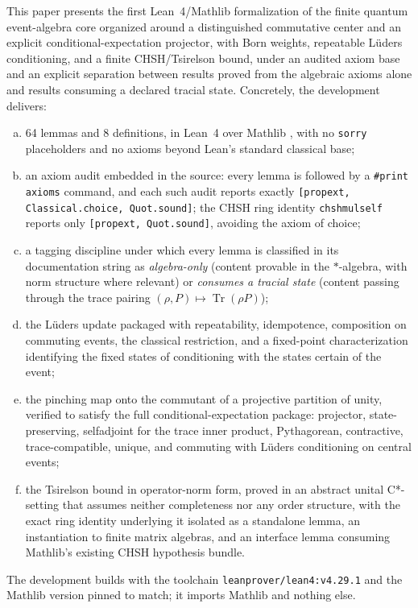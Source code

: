 \documentclass[11pt]{article}
\renewcommand{\_}{\textunderscore\allowbreak}
\theoremstyle{remark}
\newcommand{\Tr}{\operatorname{Tr}}
\begin{document}
This paper presents the first Lean~4/Mathlib formalization of the finite quantum event-algebra core organized around a distinguished commutative center and an explicit conditional-expectation projector, with Born weights, repeatable L\"uders conditioning, and a finite CHSH/Tsirelson bound, under an audited axiom base and an explicit separation between results proved from the algebraic axioms alone and results consuming a declared tracial state. Concretely, the development delivers:
\begin{enumerate}[(a)]
\item 64 lemmas and 8 definitions, in Lean~4 \cite{lean4} over Mathlib \cite{mathlib2020}, with no \texttt{sorry} placeholders and no axioms beyond Lean's standard classical base;
\item an axiom audit embedded in the source: every lemma is followed by a \texttt{\#print axioms} command, and each such audit reports exactly \texttt{[propext, Classical.choice, Quot.sound]}; the CHSH ring identity \texttt{chsh\_mul\_self} reports only \texttt{[propext, Quot.sound]}, avoiding the axiom of choice;
\item a tagging discipline under which every lemma is classified in its documentation string as \emph{algebra-only} (content provable in the $*$-algebra, with norm structure where relevant) or \emph{consumes a tracial state} (content passing through the trace pairing $(\rho,P) \mapsto \Tr(\rho P)$);
\item the L\"uders update packaged with repeatability, idempotence, composition on commuting events, the classical restriction, and a fixed-point characterization identifying the fixed states of conditioning with the states certain of the event;
\item the pinching map onto the commutant of a projective partition of unity, verified to satisfy the full conditional-expectation package: projector, state-preserving, selfadjoint for the trace inner product, Pythagorean, contractive, trace-compatible, unique, and commuting with L\"uders conditioning on central events;
\item the Tsirelson bound in operator-norm form, proved in an abstract unital C*-setting that assumes neither completeness nor any order structure, with the exact ring identity underlying it isolated as a standalone lemma, an instantiation to finite matrix algebras, and an interface lemma consuming Mathlib's existing CHSH hypothesis bundle.
\end{enumerate}
The development builds with the toolchain \texttt{leanprover/lean4:v4.29.1} and the Mathlib version pinned to match; it imports Mathlib and nothing else.
\end{document}
